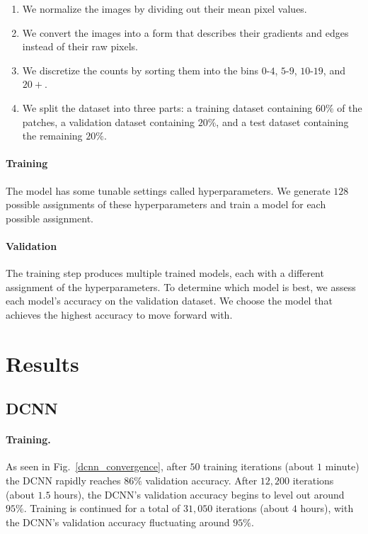 \documentclass[10pt,letterpaper]{article}
\begin{document}
            \begin{enumerate}
                \item We normalize the images by dividing out their mean pixel values.
        
                \item We convert the images into a form that describes their gradients and edges instead of their raw pixels.
        
                \item We discretize the counts by sorting them into the bins $0$-$4$, $5$-$9$, $10$-$19$, and $20+$.
        
                \item We split the dataset into three parts: a training dataset containing $60\%$ of the patches, a validation dataset containing $20\%$, and a test dataset containing the remaining $20\%$.
            \end{enumerate}

        \paragraph*{Training}
            The model has some tunable settings called hyperparameters. We generate $128$ possible assignments of these hyperparameters and train a model for each possible assignment.

        \paragraph*{Validation}
            The training step produces multiple trained models, each with a different assignment of the hyperparameters. To determine which model is best, we assess each model's accuracy on the validation dataset. We choose the model that achieves the highest accuracy to move forward with.

\section*{Results}
    \subsection*{DCNN} \label{ssec:dcnn_results}
        \paragraph*{Training.}
            As seen in Fig.~\ref{dcnn_convergence}, after $50$ training iterations (about $1$ minute) the DCNN rapidly reaches $86\%$ validation accuracy. After $12,200$ iterations (about $1.5$ hours), the DCNN's validation accuracy begins to level out around $95\%$. Training is continued for a total of $31,050$ iterations (about $4$ hours), with the DCNN's validation accuracy fluctuating around $95\%$.
            
\end{document}
